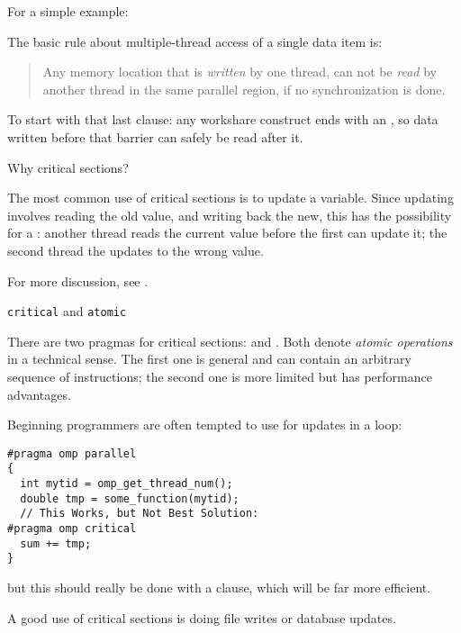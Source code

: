For a simple example:

The basic rule about multiple-thread access of a single data item is:
\begin{quote}
  Any memory location that is \emph{written} by one thread, can not be
  \emph{read} by another thread in the same parallel region, if no
  synchronization is done.
\end{quote}

To start with that last clause: any workshare construct ends with an
, so data written before that barrier
can safely be read after it.

 {Why critical sections?}

The most common use of critical sections is to update a variable. Since updating
involves reading the old value, and writing back the new, this has the possibility
for a : another thread reads the current value
before the first can update it; the second thread the updates to the wrong value.

For more discussion, see .

 {\texttt{critical} and \texttt{atomic}}
\label{sec:critical}

There are two pragmas for critical sections:  and .
Both denote \emph{atomic operations}
in a technical sense.
The first one is general and can contain an arbitrary sequence of instructions;
the second one is more limited but has performance advantages.

Beginning programmers are often tempted to use 
for updates in a loop:
\begin{lstlisting}
#pragma omp parallel
{
  int mytid = omp_get_thread_num();
  double tmp = some_function(mytid);
  // This Works, but Not Best Solution:
#pragma omp critical
  sum += tmp;
}
\end{lstlisting}
but this should really be done with a  clause,
which will be far more efficient.

A good use of critical sections is doing file writes or database updates.


